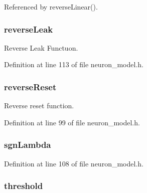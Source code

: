 Referenced by reverse\+Linear().

\hypertarget{structneuron_state_a0f71d6ac3efc9d397adfcc72c7fe40c1}{}
\subsubsection[{reverse\+Leak}]{ reverse\+Leak}\label{structneuron_state_a0f71d6ac3efc9d397adfcc72c7fe40c1}


Reverse Leak Functuon. 



Definition at line 113 of file neuron\+\_\+model.\+h.

\hypertarget{structneuron_state_abf6970098695585c81e101b2a741b9a5}{}
\subsubsection[{reverse\+Reset}]{ reverse\+Reset}\label{structneuron_state_abf6970098695585c81e101b2a741b9a5}


Reverse reset function. 



Definition at line 99 of file neuron\+\_\+model.\+h.

\hypertarget{structneuron_state_a15348eb48eb71000bf4309a776d39cfe}{}
\subsubsection[{sgn\+Lambda}]{ sgn\+Lambda}\label{structneuron_state_a15348eb48eb71000bf4309a776d39cfe}


Definition at line 108 of file neuron\+\_\+model.\+h.

\hypertarget{structneuron_state_ac3d7ce178528ec72b94fc0698be8213a}{}
\subsubsection[{threshold}]{ threshold}\label{structneuron_state_ac3d7ce178528ec72b94fc0698be8213a}


